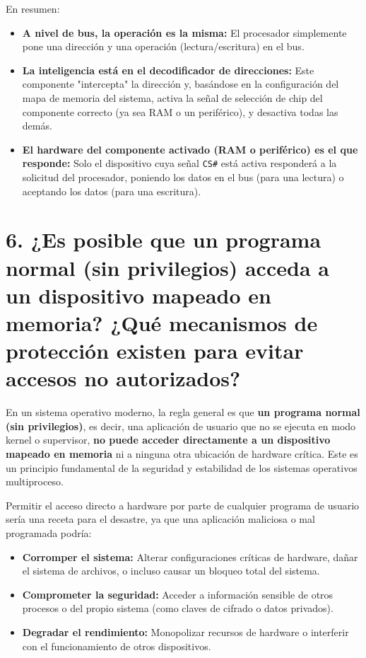 \documentclass[12pt, a4paper]{article}
\begin{document}
En resumen:
\begin{itemize}
    \item \textbf{A nivel de bus, la operación es la misma:} El procesador simplemente pone una dirección y una operación (lectura/escritura) en el bus.
    \item \textbf{La inteligencia está en el decodificador de direcciones:} Este componente "intercepta" la dirección y, basándose en la configuración del mapa de memoria del sistema, activa la señal de selección de chip del componente correcto (ya sea RAM o un periférico), y desactiva todas las demás.
    \item \textbf{El hardware del componente activado (RAM o periférico) es el que responde:} Solo el dispositivo cuya señal \texttt{CS\#} está activa responderá a la solicitud del procesador, poniendo los datos en el bus (para una lectura) o aceptando los datos (para una escritura).
\end{itemize}

\section*{6. ¿Es posible que un programa normal (sin privilegios) acceda a un dispositivo mapeado en memoria? ¿Qué mecanismos de protección existen para evitar accesos no autorizados?}
En un sistema operativo moderno, la regla general es que \textbf{un programa normal (sin privilegios)}, es decir, una aplicación de usuario que no se ejecuta en modo kernel o supervisor, \textbf{no puede acceder directamente a un dispositivo mapeado en memoria} ni a ninguna otra ubicación de hardware crítica. Este es un principio fundamental de la seguridad y estabilidad de los sistemas operativos multiproceso.

Permitir el acceso directo a hardware por parte de cualquier programa de usuario sería una receta para el desastre, ya que una aplicación maliciosa o mal programada podría:
\begin{itemize}
    \item \textbf{Corromper el sistema:} Alterar configuraciones críticas de hardware, dañar el sistema de archivos, o incluso causar un bloqueo total del sistema.
    \item \textbf{Comprometer la seguridad:} Acceder a información sensible de otros procesos o del propio sistema (como claves de cifrado o datos privados).
    \item \textbf{Degradar el rendimiento:} Monopolizar recursos de hardware o interferir con el funcionamiento de otros dispositivos.
\end{itemize}
\end{document}
